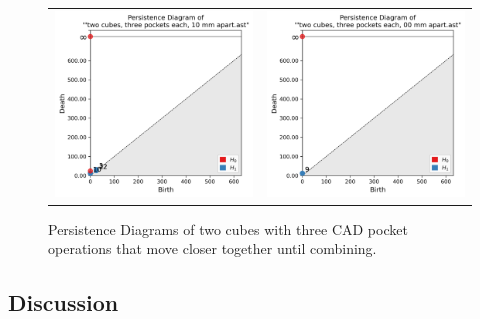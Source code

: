 \documentclass[ma]{uncgdissertationexp}
\theoremstyle{plain}
\theoremstyle{definition}
\theoremstyle{remark}
\begin{document}
\begin{figure}[H]
\begin{center}
\begin{tabular}{cc}
         \includegraphics[width=2.5in]{Final Run, (two cubes, three pockets each, 10 mm apart) persdia.png} & 
         \includegraphics[width=2.5in]{Final Run, (two cubes, three pockets each, 00 mm apart) persdia.png} \\
\end{tabular}
\end{center}
    \caption{Persistence Diagrams of two cubes with three CAD pocket operations that move closer together until combining.}
    \label{fig:cube_two_cubes_persdia_table}
\end{figure}

\subsection{Discussion}


\newpage
\end{document}
